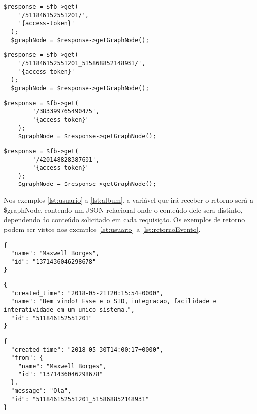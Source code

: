 \begin{lstlisting}[caption={Requisitar informações de uma postagem específica},label={lst:postagem}]
  $response = $fb->get(
    '/511846152551201/',
    '{access-token}'
  );
  $graphNode = $response->getGraphNode();
\end{lstlisting}

\begin{lstlisting}[caption={Requisitar informações de um comentário específico},label={lst:comentario}]
  $response = $fb->get(
    '/511846152551201_515868852148931/',
    '{access-token}'
  );
  $graphNode = $response->getGraphNode();
\end{lstlisting}

\begin{lstlisting}[caption={Requisitar uma evento específico},label={lst:evento}]
	$response = $fb->get(
    	'/383399765490475',
    	'{access-token}'
	);
	$graphNode = $response->getGraphNode();
\end{lstlisting}

\begin{lstlisting}[caption={Requisitar uma álbum específico},label={lst:album}]
	$response = $fb->get(
		'/420148828387601',
		'{access-token}'
	);
	$graphNode = $response->getGraphNode();
\end{lstlisting}

Nos exemplos \ref{lst:usuario} a \ref{lst:album}, a variável que irá receber o retorno será a \$graphNode, contendo um JSON relacional onde o conteúdo dele será distinto, dependendo do conteúdo solicitado em cada requisição. Os exemplos de retorno podem ser vistos nos exemplos \ref{lst:usuario} a \ref{lst:retornoEvento}.

\begin{lstlisting}[caption={Resposta do servidor as requisições \ref{lst:usuario}, \ref{lst:me} e \ref{lst:pagina}},label={lst:retornoUsuario}]
{
  "name": "Maxwell Borges",
  "id": "1371436046298678"
}
\end{lstlisting}

\begin{lstlisting}[caption={Resposta do servidor a uma requisição \ref{lst:postagem}},label={lst:retornoPostagem}]
{
  "created_time": "2018-05-21T20:15:54+0000",
  "name": "Bem vindo! Esse e o SID, integracao, facilidade e interatividade em um unico sistema.",
  "id": "511846152551201"
}
\end{lstlisting}

\begin{lstlisting}[caption={Resposta do servidor a uma requisição \ref{lst:comentario}},label={lst:retornoComentario}]
{
  "created_time": "2018-05-30T14:00:17+0000",
  "from": {
    "name": "Maxwell Borges",
    "id": "1371436046298678"
  },
  "message": "Ola",
  "id": "511846152551201_515868852148931"
}
\end{lstlisting}

